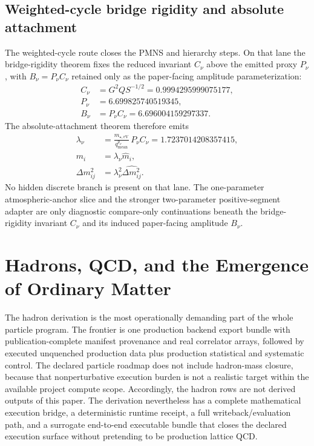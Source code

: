 \documentclass[11pt]{article}
\begin{document}
\subsection{Weighted-cycle bridge rigidity and absolute attachment}

The weighted-cycle route closes the PMNS and hierarchy steps. On that lane the
bridge-rigidity theorem fixes the reduced invariant \(C_\nu\) above the emitted
proxy \(P_\nu\), with \(B_\nu=P_\nu C_\nu\) retained only as the paper-facing
amplitude parameterization:
\[
\begin{aligned}
C_\nu&=G^2Q S^{-1/2}=0.9994295999075177,\\
P_\nu&=6.699825740519345,\\
B_\nu&=P_\nu C_\nu=6.696004159297337.
\end{aligned}
\]
The absolute-attachment theorem therefore emits
\[
\begin{aligned}
\lambda_\nu&=\frac{m_{\star,\mathrm{eV}}}{q_{\mathrm{mean}}^{p_\nu}}\,P_\nu C_\nu=1.7237014208357415,\\
m_i&=\lambda_\nu \hat m_i,\\
\Delta m_{ij}^2&=\lambda_\nu^2\widehat{\Delta m_{ij}^2}.
\end{aligned}
\]
No hidden discrete branch is present on that lane. The one-parameter atmospheric-anchor slice and
the stronger two-parameter positive-segment adapter are only diagnostic compare-only
continuations beneath the bridge-rigidity invariant \(C_\nu\) and its induced paper-facing amplitude \(B_\nu\).

\section{Hadrons, QCD, and the Emergence of Ordinary Matter}

The hadron derivation is the most operationally demanding part of the whole particle program. The
frontier is one production backend export bundle with publication-complete manifest provenance and real correlator arrays, followed by executed unquenched production data plus
production statistical and systematic control. The declared particle roadmap does not include hadron-mass closure, because that nonperturbative execution burden is not a realistic target within the available project compute scope. Accordingly, the hadron rows are not
derived outputs of this paper. The derivation nevertheless has a complete
mathematical execution bridge, a deterministic runtime receipt, a full writeback/evaluation path,
and a surrogate end-to-end executable bundle that closes the declared execution surface without
pretending to be production lattice QCD.
\end{document}
